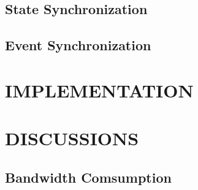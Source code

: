 \documentclass{sigchi}
\begin{document}



\subsection{State Synchronization}
\label{statesync}

\subsection{Event Synchronization}
\label{eventsync}


\section{IMPLEMENTATION}
\label{implementation}



\section{DISCUSSIONS}
\label{discussions}

\subsection{Bandwidth Comsumption}
\end{document}
